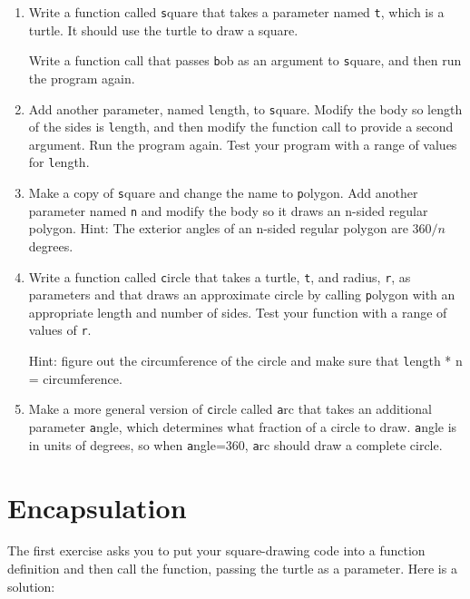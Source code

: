 \documentclass[
DIV=11,
fontsize=12,
twoside,
headinclude=false,
titlepage=firstiscover,
abstract=true,
headsepline=true,
footsepline=true,
chapterprefix=true, %
headings=big,
bibliography=totoc,%
captions=tableheading
]{scrbook}
\theoremstyle{definition}
\begin{document}
\begin{enumerate}

\item Write a function called {\texttt square} that takes a parameter
named {\texttt t}, which is a turtle.  It should use the turtle to draw
a square.

Write a function call that passes {\texttt bob} as an argument to
{\texttt square}, and then run the program again.

\item Add another parameter, named {\texttt length}, to {\texttt square}.
Modify the body so length of the sides is {\texttt length}, and then
modify the function call to provide a second argument.  Run the
program again.  Test your program with a range of values for {\texttt
length}.

\item Make a copy of {\texttt square} and change the name to {\texttt
  polygon}.  Add another parameter named {\texttt n} and modify the body
  so it draws an n-sided regular polygon.  Hint: The exterior angles
  of an n-sided regular polygon are $360/n$ degrees.   

\item Write a function called {\texttt circle} that takes a turtle, 
{\texttt t}, and radius, {\texttt r}, as parameters and that draws an
approximate circle by calling {\texttt polygon} with an appropriate
length and number of sides.  Test your function with a range of values
of {\texttt r}.   

Hint: figure out the circumference of the circle and make sure that
{\texttt length * n = circumference}.

\item Make a more general version of {\texttt circle} called {\texttt arc}
that takes an additional parameter {\texttt angle}, which determines
what fraction of a circle to draw.  {\texttt angle} is in units of
degrees, so when {\texttt angle=360}, {\texttt arc} should draw a complete
circle.

\end{enumerate}


\section{Encapsulation}

The first exercise asks you to put your square-drawing code
into a function definition and then call the function, passing
the turtle as a parameter.  Here is a solution:
\end{document}
